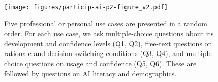 
\begin{figure}[hbtp]
    \centering
    \texttt{[image: figures/particip-ai-p2-figure\_v2.pdf]}
    \caption{Five professional or personal use cases are presented in a random order. For each use case, we ask multiple-choice questions about its development and confidence levels (Q1, Q2), free-text questions on rationale and decision-switching conditions (Q3, Q4), and multiple-choice questions on usage and confidence (Q5, Q6). These are followed by questions on AI literacy and demographics.}
    \label{fig:survey-flow}
\end{figure}

%